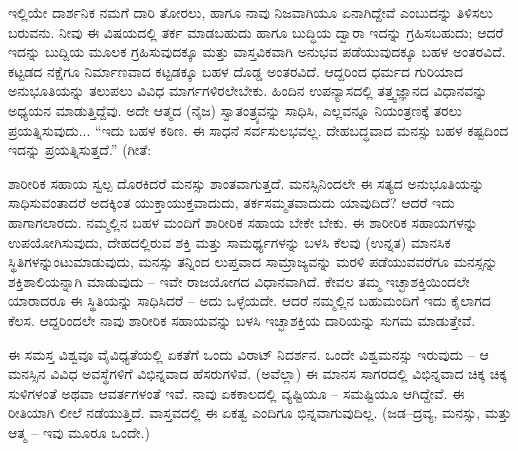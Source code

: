 \vskip 6pt

ಇಲ್ಲಿಯೇ ದಾರ್ಶನಿಕ ನಮಗೆ ದಾರಿ ತೋರಲು, ಹಾಗೂ ನಾವು ನಿಜವಾಗಿಯೂ ಏನಾಗಿದ್ದೇವೆ ಎಂಬುದನ್ನು ತಿಳಿಸಲು ಬರುವನು. ನೀವು ಈ ವಿಷಯದಲ್ಲಿ ತರ್ಕ ಮಾಡಬಹುದು ಹಾಗೂ ಬುದ್ಧಿಯ ದ್ವಾರಾ ಇದನ್ನು ಗ್ರಹಿಸಬಹುದು; ಆದರೆ ಇದನ್ನು ಬುದ್ದಿಯ ಮೂಲಕ ಗ್ರಹಿಸುವುದಕ್ಕೂ ಮತ್ತು ವಾಸ್ತವಿಕವಾಗಿ ಅನುಭವ ಪಡೆಯುವುದಕ್ಕೂ ಬಹಳ ಅಂತರವಿದೆ. ಕಟ್ಟಡದ ನಕ್ಷೆಗೂ ನಿರ್ಮಾಣವಾದ ಕಟ್ಟಡಕ್ಕೂ ಬಹಳ ದೊಡ್ಡ ಅಂತರವಿದೆ. ಆದ್ದರಿಂದ ಧರ್ಮದ ಗುರಿಯಾದ ಅನುಭೂತಿಯನ್ನು ತಲುಪಲು ವಿವಿಧ ಮಾರ್ಗಗಳಿರಲೇಬೇಕು. ಹಿಂದಿನ ಉಪನ್ಯಾಸದಲ್ಲಿ ತತ್ತ್ವಜ್ಞಾನದ ವಿಧಾನವನ್ನು ಅಧ್ಯಯನ ಮಾಡುತ್ತಿದ್ದೆವು. ಅದೇ ಆತ್ಮದ (ನೈಜ) ಸ್ವಾತಂತ್ರ್ಯವನ್ನು ಸಾಧಿಸಿ, ಎಲ್ಲವನ್ನೂ ನಿಯಂತ್ರಣಕ್ಕೆ ತರಲು ಪ್ರಯತ್ನಿಸುವುದು... “ಇದು ಬಹಳ ಕಠಿಣ. ಈ ಸಾಧನೆ ಸರ್ವಸುಲಭವಲ್ಲ. ದೇಹಬದ್ಧವಾದ ಮನಸ್ಸು ಬಹಳ ಕಷ್ಟದಿಂದ ಇದನ್ನು ಪ್ರಯತ್ನಿಸುತ್ತದೆ.” (ಗೀತೆ: 

\vskip 6pt

ಶಾರೀರಿಕ ಸಹಾಯ ಸ್ವಲ್ಪ ದೊರಕಿದರೆ ಮನಸ್ಸು ಶಾಂತವಾಗುತ್ತದೆ. ಮನಸ್ಸಿನಿಂದಲೇ ಈ ಸತ್ಯದ ಅನುಭೂತಿಯನ್ನು ಸಾಧಿಸುವಂತಾದರೆ ಅದಕ್ಕಿಂತ ಯುಕ್ತಾಯುಕ್ತವಾದುದು, ತರ್ಕಸಮ್ಮತವಾದುದು ಯಾವುದಿದೆ? ಆದರೆ ಇದು ಹಾಗಾಗಲಾರದು. ನಮ್ಮಲ್ಲಿನ ಬಹಳ ಮಂದಿಗೆ ಶಾರೀರಿಕ ಸಹಾಯ ಬೇಕೇ ಬೇಕು. ಈ ಶಾರೀರಿಕ ಸಹಾಯಗಳನ್ನು ಉಪಯೋಗಿಸುವುದು, ದೇಹದಲ್ಲಿರುವ ಶಕ್ತಿ ಮತ್ತು ಸಾಮರ್ಥ್ಯಗಳನ್ನು ಬಳಸಿ ಕೆಲವು (ಉನ್ನತ) ಮಾನಸಿಕ ಸ್ಥಿತಿಗಳನ್ನುಂಟುಮಾಡುವುದು, ಮನಸ್ಸು ತನ್ನಿಂದ ಲುಪ್ತವಾದ ಸಾಮ್ರಾಜ್ಯವನ್ನು ಮರಳಿ ಪಡೆಯುವವರೆಗೂ ಮನಸ್ಸನ್ನು ಶಕ್ತಿಶಾಲಿಯನ್ನಾಗಿ ಮಾಡುವುದು – ಇವೇ ರಾಜಯೋಗದ ವಿಧಾನವಾಗಿದೆ. ಕೇವಲ ತಮ್ಮ ಇಚ್ಛಾಶಕ್ತಿಯಿಂದಲೇ ಯಾರಾದರೂ ಈ ಸ್ಥಿತಿಯನ್ನು ಸಾಧಿಸಿದರೆ – ಅದು ಒಳ್ಳೆಯದೇ. ಆದರೆ ನಮ್ಮಲ್ಲಿನ ಬಹುಮಂದಿಗೆ ಇದು ಕೈಲಾಗದ ಕೆಲಸ. ಆದ್ದರಿಂದಲೇ ನಾವು ಶಾರೀರಿಕ ಸಹಾಯವನ್ನು ಬಳಸಿ ಇಚ್ಛಾಶಕ್ತಿಯ ದಾರಿಯನ್ನು ಸುಗಮ ಮಾಡುತ್ತೇವೆ.

\vskip 6pt

ಈ ಸಮಸ್ತ ವಿಶ್ವವೂ ವೈವಿಧ್ಯತೆಯಲ್ಲಿ ಏಕತೆಗೆ ಒಂದು ವಿರಾಟ್ ನಿದರ್ಶನ. ಒಂದೇ ವಿಶ್ವಮನಸ್ಸು ಇರುವುದು – ಆ ಮನಸ್ಸಿನ ವಿವಿಧ ಅವಸ್ಥೆಗಳಿಗೆ ವಿಭಿನ್ನವಾದ ಹೆಸರುಗಳಿವೆ. (ಅವೆಲ್ಲಾ) ಈ ಮಾನಸ ಸಾಗರದಲ್ಲಿ ವಿಭಿನ್ನವಾದ ಚಿಕ್ಕ ಚಿಕ್ಕ ಸುಳಿಗಳಂತೆ ಅಥವಾ ಆವರ್ತಗಳಂತೆ ಇವೆ. ನಾವು ಏಕಕಾಲದಲ್ಲಿ ವ್ಯಷ್ಟಿಯೂ – ಸಮಷ್ಟಿಯೂ ಆಗಿದ್ದೇವೆ. ಈ ರೀತಿಯಾಗಿ ಲೀಲೆ ನಡೆಯುತ್ತಿದೆ. ವಾಸ್ತವದಲ್ಲಿ ಈ ಏಕತ್ವ ಎಂದಿಗೂ ಭಿನ್ನವಾಗುವುದಿಲ್ಲ. (ಜಡ–ದ್ರವ್ಯ, ಮನಸ್ಸು, ಮತ್ತು ಆತ್ಮ – ಇವು ಮೂರೂ ಒಂದೇ.)

\vskip 6pt


